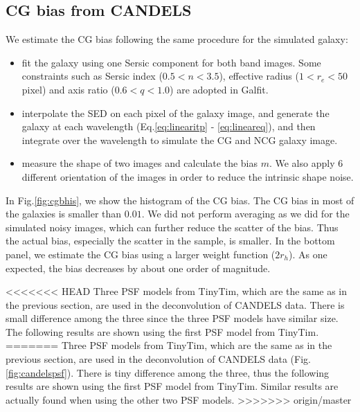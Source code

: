 \documentclass[useAMS,usenatbib]{mn2e}
\begin{document}
\subsection{CG bias from CANDELS}
We estimate the CG bias following the same procedure for the simulated galaxy:
\begin{itemize}
  \item
    fit the galaxy using one Sersic component for both band
    images. Some constraints such as Sersic index ($0.5<n<3.5$),
    effective radius ($1<r_e<50$ pixel) and axis ratio ($0.6<q<1.0$)
    are adopted in Galfit.
  \item
    interpolate the SED on each pixel of the galaxy image, and
    generate the galaxy at each wavelength (Eq.\ref{eq:linearitp} -
    \ref{eq:lineareq}), and then integrate over the wavelength to
    simulate the CG and NCG galaxy image.
  \item
    measure the shape of two images and calculate the bias $m$. We
    also apply $6$ different orientation of the images in order
    to reduce the intrinsic shape noise.
\end{itemize}
%
In Fig.\ref{fig:cgbhis}, we show the histogram of the CG bias. The CG
bias in most of the galaxies is smaller than $0.01$.  We did not
perform averaging as we did for the simulated noisy images, which can
further reduce the scatter of the bias. Thus the actual bias,
especially the scatter in the sample, is smaller.
In the bottom panel, we estimate the CG bias using a larger weight function
($2r_h$). As one expected, the bias decreases by about one order of magnitude.

<<<<<<< HEAD
Three PSF models from TinyTim, which are the same as in the previous
section, are used in the deconvolution of CANDELS data. There is small
difference among the three since the three PSF models have similar
size. The following results are shown using the first PSF model from
TinyTim. 
=======
Three PSF models from TinyTim, which are the same as in the previous section,
are used in the deconvolution of CANDELS data (Fig.\ref{fig:candelspsf}).
There is tiny difference among the three, thus the following results
are shown using the first PSF model from TinyTim. Similar results are
actually found when using the other two PSF models.
>>>>>>> origin/master
%
\end{document}
